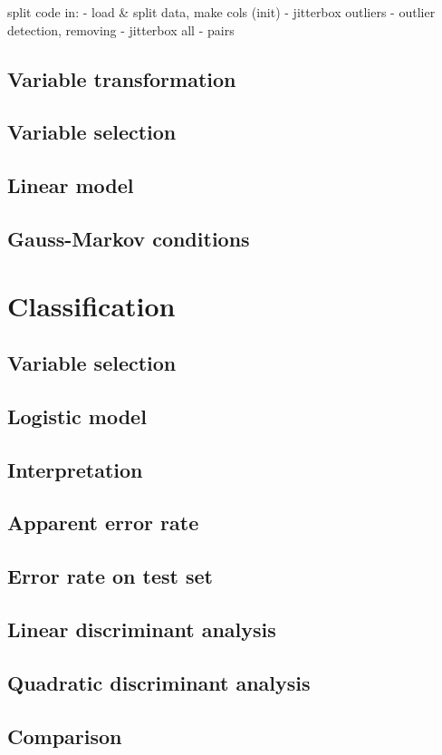 \documentclass[a4paper, 12pt]{article}
\begin{document}
split code in:
- load \& split data, make cols (init)
- jitterbox outliers
- outlier detection, removing
- jitterbox all
- pairs


\subsection*{Variable transformation}
\subsection*{Variable selection}
\subsection*{Linear model}
\subsection*{Gauss-Markov conditions}

\section{Classification}
\subsection*{Variable selection}
\subsection*{Logistic model}
\subsection*{Interpretation}
\subsection*{Apparent error rate}
\subsection*{Error rate on test set}
\subsection*{Linear discriminant analysis}
\subsection*{Quadratic discriminant analysis}
\subsection*{Comparison}
\end{document}

